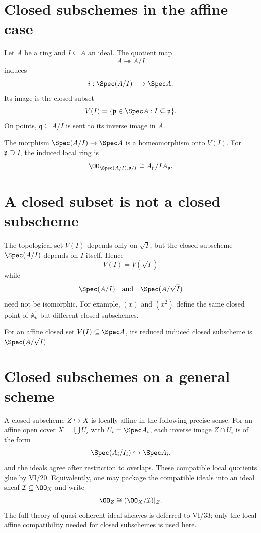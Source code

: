 \section{Closed subschemes in the affine case}
Let $A$ be a ring and $I\subseteq A$ an ideal.  The quotient map
\[
 A\twoheadrightarrow A/I
\]
induces
\[
 i:\Spec(A/I)\longrightarrow \Spec A.
\]
Its image is the closed subset
\[
 V(I)=\{\mathfrak p\in\Spec A:I\subseteq\mathfrak p\}.
\]
On points, $\mathfrak q\subseteq A/I$ is sent to its inverse image in $A$.

\begin{theorem}\label{thm:vi22-affine-closed}
The morphism $\Spec(A/I)\to\Spec A$ is a homeomorphism onto $V(I)$.  For
$\mathfrak p\supseteq I$, the induced local ring is
\[
 \OO_{\Spec(A/I),\mathfrak p/I}\cong A_{\mathfrak p}/IA_{\mathfrak p}.
\]
\end{theorem}



\section{A closed subset is not a closed subscheme}
The topological set $V(I)$ depends only on $\sqrt I$, but the closed subscheme
$\Spec(A/I)$ depends on $I$ itself.  Hence
\[
 V(I)=V(\sqrt I)
\]
while
\[
 \Spec(A/I)\quad\text{and}\quad\Spec(A/\sqrt I)
\]
need not be isomorphic.  For example, $(x)$ and $(x^2)$ define the same closed point of
$\mathbb A^1_k$ but different closed subschemes.

\begin{definition}\label{def:vi22-reduced-closed}
For an affine closed set $V(I)\subseteq\Spec A$, its reduced induced closed subscheme is
$\Spec(A/\sqrt I)$.
\end{definition}



\section{Closed subschemes on a general scheme}
A closed subscheme $Z\hookrightarrow X$ is locally affine in the following precise sense.  For
an affine open cover $X=\bigcup U_i$ with $U_i=\Spec A_i$, each inverse image
$Z\cap U_i$ is of the form
\[
 \Spec(A_i/I_i)\hookrightarrow\Spec A_i,
\]
and the ideals agree after restriction to overlaps.  These compatible local quotients glue by
VI/20.  Equivalently, one may package the compatible ideals into an ideal sheaf
$\mathcal I\subseteq\OO_X$ and write
\[
 \OO_Z\cong (\OO_X/\mathcal I)|_Z.
\]
The full theory of quasi-coherent ideal sheaves is deferred to VI/33; only the local affine
compatibility needed for closed subschemes is used here.

